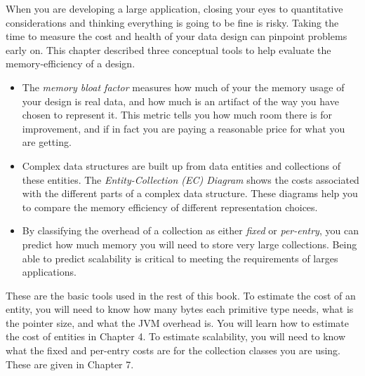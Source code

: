 When you are developing a large application, closing your eyes to quantitative
considerations and thinking everything is going to be fine is risky. Taking the
time to measure the cost and health of your data design can pinpoint problems
early on. This chapter described three conceptual tools to help evaluate the
memory-efficiency of a design.
\begin{itemize}
\item The \textsl{memory bloat factor} measures how much of your the memory
usage of your design is real data, and how much is an artifact of the way you
have chosen to represent it. This metric tells you how much room there is for
improvement, and if in fact you are paying a reasonable price for what you are
getting.
\item Complex data structures are built up from data entities and collections of
these entities.  The \textsl{Entity-Collection (EC) Diagram} shows the costs
associated with the different parts of a complex data structure. These diagrams
help you to compare the memory efficiency of different representation choices.
\item By classifying the overhead of a collection as either \textsl{fixed} or
\textsl{per-entry}, you can predict how much memory you will need to store very
large collections. Being able to predict scalability is critical to meeting the
requirements of larges applications.
\end{itemize}
These are the basic tools used in the rest of this book. To estimate the cost of
an entity, you will need to know how many bytes each primitive type needs, what
is the pointer size, and what the JVM overhead is. You will learn how to
estimate the cost of entities in Chapter 4. To estimate scalability, you will
need to know what the fixed and per-entry costs are for the collection classes
you are using. These are given in Chapter 7.

